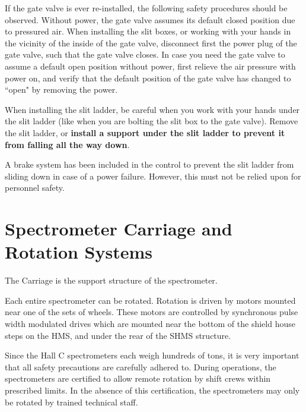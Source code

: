{If the gate valve is ever re-installed, the following safety
procedures should be observed.  Without power, the gate valve assumes its default closed position due to
pressured air. When installing the slit boxes, or working with your hands
in the vicinity of the inside of the gate valve, disconnect first the power
plug of the gate valve, such that the gate valve closes.
In case you need the gate valve to assume a default open position without
power, first relieve the air pressure
with power on, and verify that the default position of the gate valve has
changed to ``open" by removing the power.

When installing the slit ladder, be careful when you work with your hands
under the slit ladder (like when you are bolting the slit box to the
gate valve). Remove the slit ladder, or {\bf install a support under the slit
ladder to prevent it from falling all the way down}.

A brake system has been included in the control to prevent the slit ladder
from sliding down in case of a power failure.  However, this must not
be relied upon for personnel safety.

}%

\section{Spectrometer Carriage and Rotation Systems}

The Carriage is the support structure of the spectrometer.

Each entire spectrometer can be rotated. Rotation is driven by motors mounted
near one of the sets of wheels. These motors are controlled by synchronous
pulse width modulated drives which are mounted near the bottom of the shield
house steps on the HMS, and under the rear of the SHMS structure.


Since the Hall C spectrometers each weigh hundreds of
tons, it is very important that all safety precautions are carefully
adhered to.   During operations, the spectrometers are certified
to allow remote rotation by shift crews within prescribed limits.  In
the absence of this certification, the spectrometers may only be
rotated by trained technical staff.



